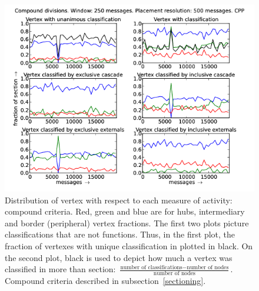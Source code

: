 \documentclass[%
 aip,
 jmp,%
 amsmath,amssymb,
 reprint,%
]{revtex4-1}
\begin{document}
\begin{figure}[hbtp] 
   \centering
        \includegraphics[width=\textwidth]{figs/CPP/250_2}
    \caption{Distribution of vertex with respect to each measure of activity: compound criteria. Red, green and blue are for hubs, intermediary and border (peripheral) vertex fractions. The first two plots picture classifications that are not functions. Thus, in the first plot, the fraction of vertexes with unique classification in plotted in black. On the second plot, black is used to depict how much a vertex was classified in more than section: $\frac{\text{number of classifications} - \text{number of nodes}}{\text{number of nodes}}$. Compound criteria described in subsection~\ref{sectioning}.}
    \label{fig:cpp250_}
\end{figure}
\end{document}
